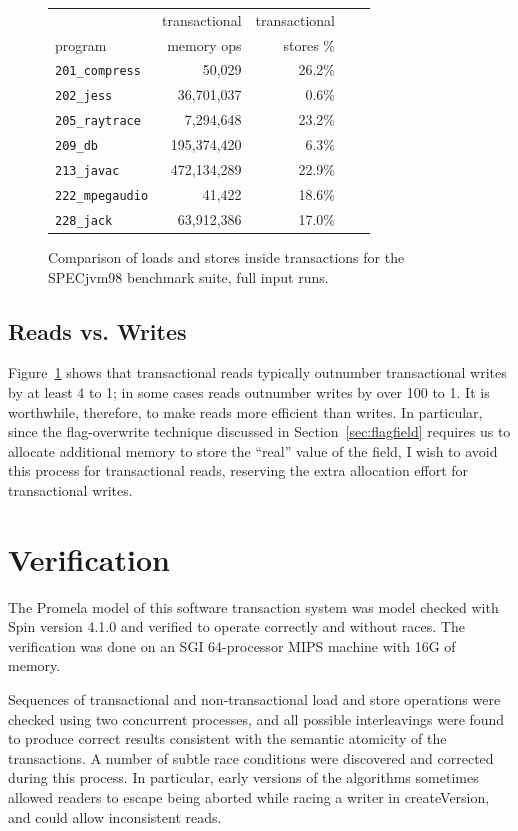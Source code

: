 \documentclass[12pt,oneside]{article}
\newcommand{\punt}[1]{}%
\newcommand{\secput}[2]{\section{#2}\label{sec:#1}}
\newcommand{\figref}[1]         {Figure~\ref{fig:#1}}
\newcommand{\secref}[1]         {Section~\ref{sec:#1}}
\begin{document}
\begin{figure}
\begin{center}
\begin{tabular}{lrrrr}
        & transactional & transactional\\
program & memory ops    & stores \% \\\hline
{\tt 201\_compress} & 50,029 & 26.2\% \\
{\tt 202\_jess} & 36,701,037 & 0.6\% \\
{\tt 205\_raytrace} & 7,294,648 & 23.2\% \\
{\tt 209\_db} & 195,374,420 & 6.3\% \\
{\tt 213\_javac} & 472,134,289 & 22.9\% \\
{\tt 222\_mpegaudio} & 41,422 & 18.6\% \\
{\tt 228\_jack} & 63,912,386 & 17.0\% \\
\end{tabular}
\end{center}
\caption{Comparison of loads and stores inside transactions for the
  SPECjvm98 benchmark suite, full input runs.}
\label{fig:writepercent}
\end{figure}
\subsection{Reads vs. Writes}
\figref{writepercent} shows that transactional reads typically
outnumber transactional writes by at least 4 to 1; in some cases reads
outnumber writes by over 100 to 1.  It is worthwhile, therefore, to
make reads more efficient than writes.  In particular, since the
flag-overwrite technique discussed in \secref{flagfield} requires us
to allocate additional memory to store the ``real'' value of the
field, I wish to avoid this process for transactional reads,
reserving the extra allocation effort for transactional writes.

\punt{
\subsection{Large objects}
See \secref{properties}.
}

\secput{verification}{Verification}
The Promela model of this software transaction system was model
checked with Spin version 4.1.0 and verified to operate correctly and
without races.  The verification was done on an SGI 64-processor MIPS
machine with 16G of memory.

Sequences of transactional and non-transactional load and store
operations were checked using two concurrent processes, and all possible
interleavings were found to produce correct results consistent with
the semantic atomicity of the transactions.  A number of subtle race
conditions were discovered and corrected during this process.
In particular, early versions of the algorithms sometimes allowed
readers to escape being aborted while racing a writer in
createVersion, and could allow inconsistent reads.
\end{document}
